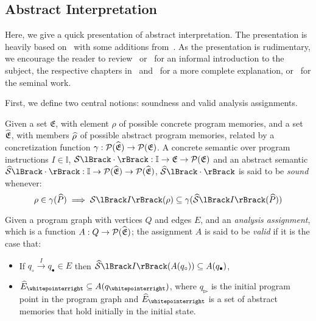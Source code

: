\subsection{Abstract Interpretation}\label{subsec:abstract-interpretation}
Here, we give a quick presentation of abstract interpretation.
The presentation is heavily based on~\cite{nielson_formal_2019} with some additions from~\cite{moller_statitc_nodate}.
As the presentation is rudimentary, we encourage the reader to review~\cite{noauthor_abstract_nodate} or~\cite{cousot_abstract_1996} for an informal introduction to the subject, the respective chapters in~\cite{nielson_formal_2019} and~\cite{moller_statitc_nodate} for a more complete explanation, or~\cite{cousot_abstract_1977} for the seminal work.

First, we define two central notions: soundness and valid analysis assignments.

\begin{definition}
    Given a set $\mathfrak{E}$, with element $\rho$ of possible concrete program memories, and a set $\widehat{\mathfrak{E}}$, with members $\widehat{\rho}$ of possible abstract program memories, related by a concretization function $\gamma : \mathcal{P}(\widehat{\mathfrak{E}}) \rightarrow \mathcal{P}(\mathfrak{E})$.
    A concrete semantic over program instructions $I \in \mathbb{I}$, $\sem{\cdot} : \mathbb{I} \rightarrow \mathfrak{E} \rightarrow \mathcal{P}(\mathfrak{E})$ and an abstract semantic $\abssem{\cdot} : \mathbb{I} \rightarrow \mathcal{P}(\ab{\mathfrak{E}}) \rightarrow \mathcal{P}(\ab{\mathfrak{E}})$, $\abssem{\cdot}$ is said to be \emph{sound} whenever:
    \begin{equation}
        \rho \in \concrete(\ab{P}) \implies \sem{I}(\rho) \subseteq \concrete(\abssem{I}(\ab{P}))\label{eq:equation12}
    \end{equation}
\end{definition}

\begin{definition}
    \label{def:valid}
    Given a program graph with vertices $Q$ and edges $E$, and an \emph{analysis assignment}, which is a function $A : Q \rightarrow \mathcal{P}(\widehat{\mathfrak{E}})$; the assignment $A$ is said to be \emph{valid} if it is the case that:
    \begin{itemize}
        \item If $q_\circ \xrightarrow{I} q_\bullet \in E$ then $\abssem{I}(A(q_\circ)) \subseteq A(q_\bullet)$,
        \item $\ab{E}_\whitepointerright \subseteq A(q_\whitepointerright)$, where $q_\whitepointerright$ is the initial program point in the program graph and $\ab{E}_\whitepointerright$ is a set of abstract memories that hold initially in the initial state.
    \end{itemize}
\end{definition}

